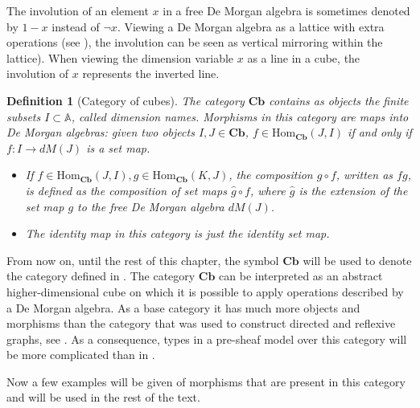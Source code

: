 \documentclass[12pt,a4paper,twoside,xetex]{book} %
\newcommand{\keyword}[1]{\emph{#1}\index{#1}}
\newtheorem{definition}[theorem]{Definition}
\newcommand{\homo}[3]{\text{Hom}_{#1}\left(#2,#3\right)}
\newcommand{\cube}[0]{\textbf{Cb}}
\begin{document}
The involution of an element $x$ in a free De Morgan algebra is sometimes 
denoted by $1-x$ instead  of $\neg x$. Viewing a De Morgan algebra as a lattice with extra operations (see ), the involution can be seen as vertical mirroring within the lattice). When viewing the dimension variable $x$ as a line in a cube, the involution of $x$ represents the inverted line. 

\begin{definition}[Category of cubes]\label{cubcat}
  The category $\cube$ contains as objects the  finite subsets $I \subset 
\mathbb{A}$, called \keyword{dimension names}. Morphisms in this category are maps into De Morgan algebras: given two objects $I,J \in \cube$, $f 
\in \text{Hom}_{\cube}(J,I)$ if and only if $f: I \rightarrow dM(J)$ is a 
set map.
  \begin{itemize}
  \item  If $f \in \homo{\cube}{J}{I}, g \in \homo{\cube}{K}{J}$, 
the composition $g \circ f$, written as $fg$, is defined as the composition  
of set maps $\hat{g} \circ f$, where $\hat{g}$ is the extension of the set map $g$ to the free De 
Morgan algebra $dM(J)$.
    \item The identity map in this category is just the identity set map.
\end{itemize}
    \end{definition}

From now on, until the rest of this chapter, the symbol $\cube$ will be 
used to denote the category defined in . The category $\cube$ can be 
interpreted as an abstract higher-dimensional cube on which it is possible to 
apply operations described by a De Morgan algebra. As a base category it has 
much more objects and morphisms than the category that was used to construct 
directed and reflexive graphs, see . As a consequence, types in 
a pre-sheaf model over this category will be more complicated than in 
.

Now a few examples will be given of morphisms that are present in this category 
and will be used in the rest of the text.
\end{document}
